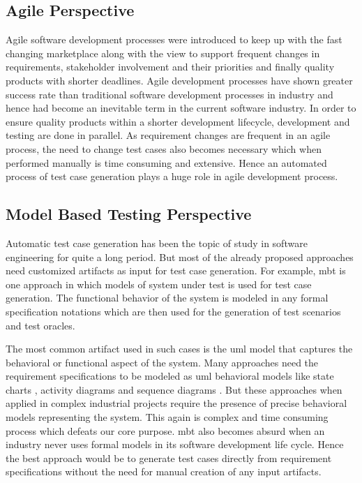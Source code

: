 \subsection{Agile Perspective}
Agile software development processes \cite{ambler2009agile} were introduced to keep up with the fast changing marketplace along with the view to support frequent changes in requirements, stakeholder involvement and their priorities and finally quality products with shorter deadlines. Agile development processes have shown greater success rate than traditional software development processes in industry and hence had become an inevitable term in the current software industry. In order to ensure quality products within a shorter development lifecycle, development and testing are done in parallel. As requirement changes are frequent in an agile process, the need to change test cases also becomes necessary which when performed manually is time consuming and extensive. Hence an automated process of test case generation plays a huge role in agile development process.
\subsection{Model Based Testing Perspective}
Automatic test case generation has been the topic of study in software engineering for quite a long period. But most of the already proposed approaches need customized artifacts as input for test case generation. For example, \gls{mbt} is one approach in which models of system under test is used for test case generation.  The functional behavior of the system is modeled in any formal specification notations \cite{carvalho2013test} which are then used for the generation of test scenarios and test oracles.

The most common artifact used in such cases is the \gls{uml} model that captures the behavioral or functional aspect of the system. Many approaches need the requirement specifications to be modeled as \gls{uml} behavioral models like state charts \cite{ryser1999scenario}, activity diagrams \cite{linzhang2004generating} and sequence diagrams \cite{nebut2006automatic}.  But these approaches when applied in complex industrial projects require the presence of precise behavioral models representing the system. This again is complex and time consuming process which defeats our core purpose. \gls{mbt} also becomes absurd when an industry never uses formal models in its software development life cycle.  Hence the best approach would be to generate test cases directly from requirement specifications without the need for manual creation of any input artifacts.

